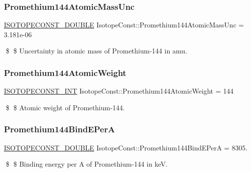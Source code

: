 \subsubsection{\texorpdfstring{Promethium144\+Atomic\+Mass\+Unc}{Promethium144AtomicMassUnc}}
{\footnotesize\ttfamily \mbox{\hyperlink{group___isotope_const-_macros_ga8f45a7272ce02c0b4c65c44636ed719a}{I\+S\+O\+T\+O\+P\+E\+C\+O\+N\+S\+T\+\_\+\+D\+O\+U\+B\+LE}} Isotope\+Const\+::\+Promethium144\+Atomic\+Mass\+Unc = 3.\+181e-\/06}

\$ \$ Uncertainty in atomic mass of Promethium-\/144 in amu. \mbox{\label{group___isotope_const-_promethium-_pm144_ga8b0d187d174b688a097590e0e37cdec3}} 
\subsubsection{\texorpdfstring{Promethium144\+Atomic\+Weight}{Promethium144AtomicWeight}}
{\footnotesize\ttfamily \mbox{\hyperlink{group___isotope_const-_macros_ga5f18360b3e99483a35c32d789e62621c}{I\+S\+O\+T\+O\+P\+E\+C\+O\+N\+S\+T\+\_\+\+I\+NT}} Isotope\+Const\+::\+Promethium144\+Atomic\+Weight = 144}

\$ \$ Atomic weight of Promethium-\/144. \mbox{\label{group___isotope_const-_promethium-_pm144_gae2d44000581dfb2faa46f2dcd6f4dc42}} 
\subsubsection{\texorpdfstring{Promethium144\+Bind\+E\+PerA}{Promethium144BindEPerA}}
{\footnotesize\ttfamily \mbox{\hyperlink{group___isotope_const-_macros_ga8f45a7272ce02c0b4c65c44636ed719a}{I\+S\+O\+T\+O\+P\+E\+C\+O\+N\+S\+T\+\_\+\+D\+O\+U\+B\+LE}} Isotope\+Const\+::\+Promethium144\+Bind\+E\+PerA = 8305.}

\$ \$ Binding energy per A of Promethium-\/144 in keV. \mbox{\label{group___isotope_const-_promethium-_pm144_gae0e690d9717636209359a337138b0464}} 
